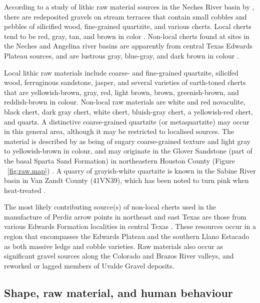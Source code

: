 \documentclass[review]{elsarticle}
\begin{document}
According to a study of lithic raw material sources in the Neches River basin by \citet[69]{RN1253}, there are redeposited gravels on stream terraces that contain small cobbles and pebbles of silicified wood, fine-grained quartzite, and various cherts. Local cherts tend to be red, gray, tan, and brown in color \cite[66]{RN1253}. Non-local cherts found at sites in the Neches and Angelina river basins are apparently from central Texas Edwards Plateau sources, and are lustrous gray, blue-gray, and dark brown in colour \citep{RN1253}.

Local lithic raw materials include coarse- and fine-grained quartzite, silicifed wood, ferruginous sandstone, jasper, and several varieties of earth-toned cherts that are yellowish-brown, gray, red, light brown, brown, greenish-brown, and reddish-brown in colour. Non-local raw materials are white and red novaculite, black chert, dark gray chert, white chert, bluish-gray chert, a yellowish-red chert, and quartz. A distinctive coarse-grained quartzite (or metaquartzite) may occur in this general area, although it may be restricted to localised sources. The material is described by \citet[67]{RN1253} as being of sugary coarse-grained texture and light gray to yellowish-brown in colour, and may originate in the Glover Sandstone (part of the basal Sparta Sand Formation) in northeastern Houston County (Figure ~\ref{fig:raw.map}) \cite[69]{RN1253}. A quarry of grayish-white quartzite is known in the Sabine River basin in Van Zandt County (41VN39), which has been noted to turn pink when heat-treated \citep{RN1898}.

The most likely contributing source(s) of non-local cherts used in the manufacture of Perdiz arrow points in northeast and east Texas are those from various Edwards Formation localities in central Texas \citep{RN439,RN2145}. These resources occur in a region that encompasses the Edwards Plateau and the southern Llano Estacado as both massive ledge and cobble varieties. Raw materials also occur as significant gravel sources along the Colorado and Brazos River valleys, and reworked or lagged members of Uvalde Gravel deposits.

\subsection*{Shape, raw material, and human behaviour}
\end{document}
